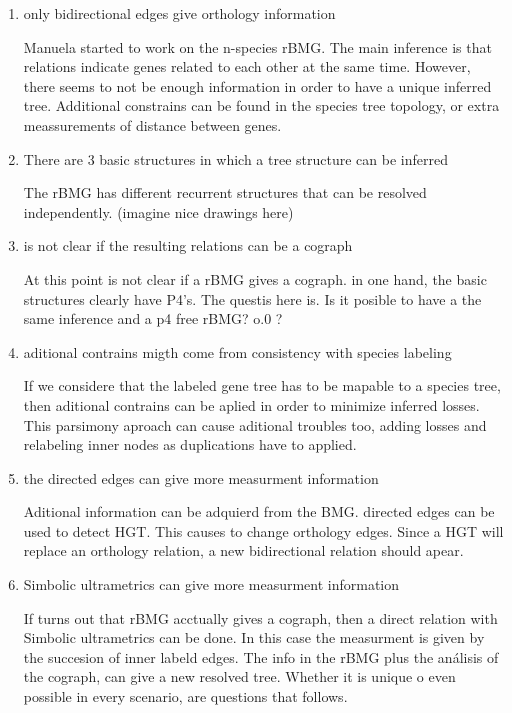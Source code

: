 \documentclass[11pt]{article}
\begin{document}
\begin{enumerate}
\item only bidirectional edges give orthology information

Manuela started to work on the n-species rBMG. The main inference is that relations indicate genes related to each other at the same time. However, there seems to not be enough information in order to have a unique inferred tree. Additional constrains can be found in the species tree topology, or extra meassurements of distance between genes.

\item There are 3 basic structures in which a tree structure can be inferred

The rBMG has different recurrent structures that can be resolved independently. (imagine nice drawings here)

\item is not clear if the resulting relations can be a cograph

At this point is not clear if a rBMG gives a cograph. in one hand, the basic structures clearly have P4's. The questis here is. Is it posible to have a the same inference and a p4 free rBMG? o.0 ?

\item aditional contrains migth come from consistency with species labeling

If we considere that the labeled gene tree has to be mapable to a species tree, then aditional contrains can be aplied in order to minimize inferred losses.
This parsimony aproach can cause aditional troubles too, adding losses and relabeling inner nodes as duplications have to applied.

\item the directed edges can give more measurment information

Aditional information can be adquierd from the BMG. directed edges can be used to detect HGT. This causes to change orthology edges. Since a HGT will replace an orthology relation, a new bidirectional relation should apear.

\item Simbolic ultrametrics can give more measurment information

If turns out that rBMG acctually gives a cograph, then a direct relation with Simbolic ultrametrics can be done.
In this case the measurment is given by the succesion of inner labeld edges.
The info in the rBMG plus the análisis of the cograph, can give a new resolved tree. Whether it is unique o even possible in every scenario, are questions that follows.


\end{enumerate}
\end{document}
